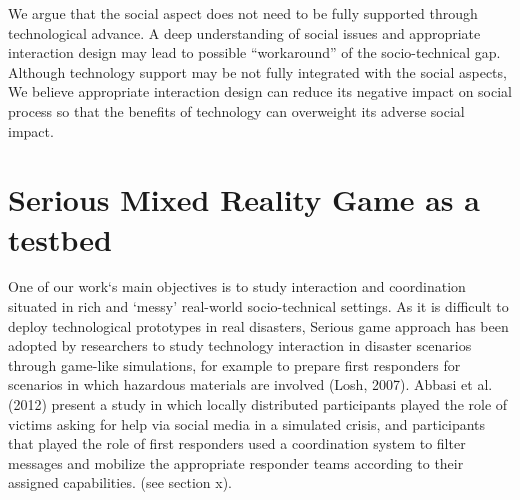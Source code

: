 We argue that the social aspect does not need to be fully supported through technological advance. A deep understanding of social issues and appropriate interaction design may lead to possible ``workaround'' of the socio-technical gap. Although technology support may be not fully integrated with the social aspects, We believe appropriate interaction design can reduce its negative impact on social process so that the benefits of technology can overweight its adverse social impact. \\





\section{Serious Mixed Reality Game as a testbed} \label{sec:SMRG}
One of our work`s main objectives is to study interaction and coordination situated in rich and `messy' real-world socio-technical settings. As it is difficult to deploy technological prototypes in real disasters, Serious game approach has been adopted by researchers to study technology interaction in disaster scenarios through game-like simulations, for example to prepare first responders for scenarios in which hazardous materials are involved (Losh, 2007). Abbasi et al. (2012) present a study in which locally distributed participants played the role of victims asking for help via social media in a simulated crisis, and participants that played the role of first responders used a coordination system to filter messages and mobilize the appropriate responder teams according to their assigned capabilities. (see section x).\\

